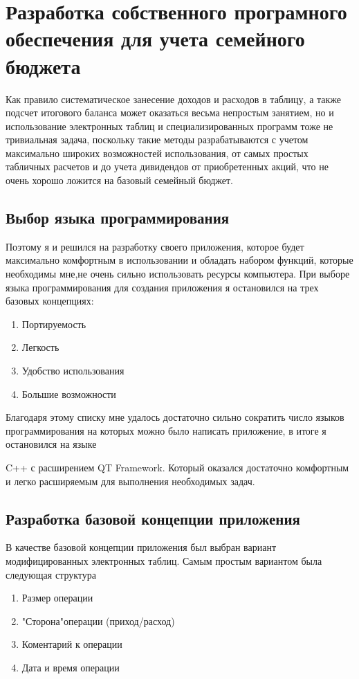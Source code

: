 \section{Разработка собственного програмного обеспечения для учета семейного бюджета}

Как правило систематическое занесение доходов и расходов в таблицу, а
также подсчет итогового баланса может оказаться весьма непростым занятием, но и использование электронных таблиц и специализированных программ
тоже не тривиальная задача, поскольку такие методы разрабатываются с учетом максимально широких возможностей использования, от самых простых
табличных расчетов и до учета дивидендов от приобретенных акций, что не
очень хорошо ложится на базовый семейный бюджет.

\subsection{Выбор языка программирования}

Поэтому я и решился на разработку своего приложения, которое будет
максимально комфортным в использовании и обладать набором функций,
которые необходимы мне,не очень сильно использовать ресурсы компьютера.
При выборе языка программирования для создания приложения я остановился на трех базовых концепциях:

\begin{enumerate}
\item Портируемость
\item Легкость
\item Удобство использования
\item Большие возможности
\end{enumerate}

Благодаря этому списку мне удалось достаточно сильно сократить число
языков программирования на которых можно было написать приложение, в
итоге я остановился на языке

C++ с расширением QT Framework. Который оказался достаточно комфортным и легко расширяемым для выполнения необходимых задач.

\subsection{Разработка базовой концепции приложения}
В качестве базовой концепции приложения был выбран вариант модифицированных электронных таблиц. Самым простым вариантом была следующая структура
\begin{enumerate}
\item Размер операции
\item "Сторона"операции (приход/расход)
\item Коментарий к операции
\item Дата и время операции
\end{enumerate}

